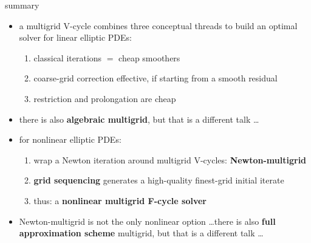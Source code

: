 \documentclass[10pt,
               svgnames,
               hyperref={colorlinks,citecolor=DeepPink4,linkcolor=FireBrick,urlcolor=Maroon},
               usepdftitle=false]{beamer}
\begin{document}
\begin{frame}{summary}
\begin{itemize}
\item a multigrid V-cycle combines three conceptual threads to build an optimal solver for linear elliptic PDEs:
\begin{enumerate}
\item classical iterations $=$ cheap smoothers
\item coarse-grid correction effective, if starting from a smooth residual
\item restriction and prolongation are cheap
\end{enumerate}

\medskip
\item there is also \textbf{algebraic multigrid}, but that is a different talk \dots

\medskip
\item<2> for nonlinear elliptic PDEs:
\begin{enumerate}
\item wrap a Newton iteration around multigrid V-cycles: \textbf{Newton-multigrid}
\item \textbf{grid sequencing} generates a high-quality finest-grid initial iterate
\item thus: a \textbf{nonlinear multigrid F-cycle solver}
\end{enumerate}

\medskip
\item<2> Newton-multigrid is not the only nonlinear option \dots there is also \textbf{full approximation scheme} multigrid, but that is a different talk \dots
\end{itemize}
\end{frame}
\end{document}
